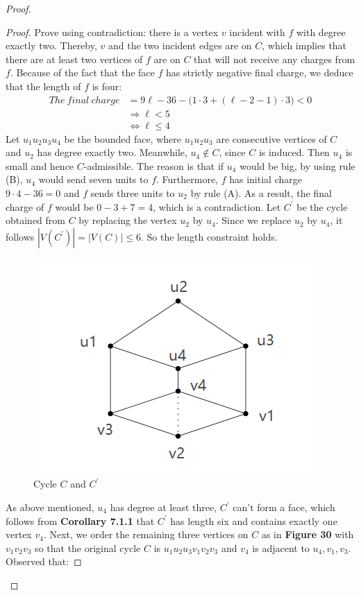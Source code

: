 \begin{proof}
\begin{proof}
Prove using contradiction: there is a vertex $v$ incident with $f$ with degree exactly two. Thereby, $v$ and the two incident edges are on $C$, which implies that there are at least two vertices of $f$ are on $C$ that will not receive any charges from $f$. Because of the fact that the face $f$ has strictly negative final charge, we deduce that the length of $f$ is four:
\begin{align*}
    The \ final \ charge &= 9\ell -36 - \big(1 \cdot 3 + (\ell - 2 - 1) \cdot 3\big) < 0\\
    &\Longrightarrow \ell < 5\\
    &\Longleftrightarrow \ell \leq 4 
\end{align*}
Let $u_1u_2u_3u_4$ be the bounded face, where $u_1u_2u_3$ are consecutive vertices of $C$ and $u_2$ has degree exactly two. Meanwhile, $u_4 \notin C$, since $C$ is induced. Then $u_4$ is small and hence $C$-admissible. The reason is that if $u_4$ would be big, by using rule (B), $u_4$ would send seven units to $f$. Furthermore, $f$ has initial charge $9\cdot4 - 36 = 0$ and $f$ sends three units to $u_2$ by rule (A). As a result, the final charge of $f$ would be $0 - 3 + 7 = 4$, which is a contradiction. Let $C^{'}$ be the cycle obtained from $C$ by replacing the vertex $u_2$ by $u_4$. Since we replace $u_2$ by $u_4$, it follows $|V(C^{'})| = |V(C)| \leq 6$. So the length constraint holds.
\begin{figure}[H] %
    \centering %
    \includegraphics[width=0.4 \textwidth]{figure/corollary3.png} 
    \caption{Cycle $C$ and $C^{'}$} %
    \label{figure} %
\end{figure}
As above mentioned, $u_4$ has degree at least three, $C^{'}$ can't form a face, which follows from \textbf{Corollary 7.1.1} that $C^{'}$ has length six and contains exactly one vertex $v_4$. Next, we order the remaining three vertices on $C$ as in \textbf{Figure 30} with $v_1v_2v_3$ so that the original cycle $C$ is $u_1u_2u_3v_1v_2v_3$ and $v_4$ is adjacent to $u_4, v_1, v_3$. Observed that:

\end{proof}
\end{proof}
